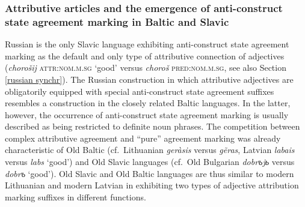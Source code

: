 \subsubsection[Baltic and Slavic]{Attributive articles and the emergence of anti-construct state agreement marking in Baltic and Slavic} \label{slavic diachr}


Russian is the only Slavic language exhibiting anti-construct state agreement marking as the default and only type of attributive connection of adjectives (\textit{chorošij} \textsc{attr:nom.m.sg} ‘good’ versus \textit{choroš} \textsc{pred:nom.m.sg}, see also Section \ref{russian synchr}). The Russian construction in which attributive adjectives are obligatorily equipped with special anti-construct state agreement suffixes resembles a construction in the closely related Baltic languages. In the latter, however, the occurrence of anti-construct state agreement marking is usually described as being restricted to definite noun phrases. The competition between complex attributive agreement and “pure” agreement marking was  already characteristic of Old Baltic (cf.~Lithuanian \textit{geràsis} versus \textit{g{\~e}ras}, Latvian \textit{labais} versus \textit{labs} ‘good’) and Old Slavic languages (cf.~Old Bulgarian \textit{dobrъjь} versus \textit{dobrъ} ‘good’). Old Slavic and Old Baltic languages are thus similar to modern Lithuanian and modern Latvian in exhibiting two types of adjective attribution marking suffixes in different functions.

